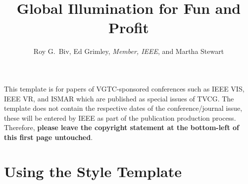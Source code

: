 \documentclass[journal]{vgtc}                %
\title{Global Illumination for Fun and Profit}
\author{Roy G.\ Biv, Ed Grimley, \textit{Member, IEEE}, and Martha Stewart}
\begin{document}


\maketitle

This template is for papers of VGTC-sponsored conferences such as IEEE VIS, IEEE VR, and ISMAR which are published as special issues of TVCG.
The template does not contain the respective dates of the conference/journal issue, these will be entered by IEEE as part of the publication production process.
Therefore, \textbf{please leave the copyright statement at the bottom-left of this first page untouched}.


\section{Using the Style Template}
\end{document}
